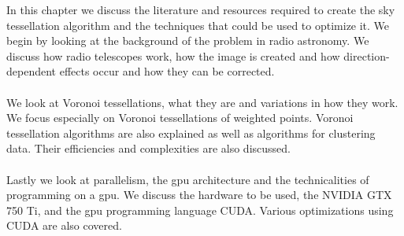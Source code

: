 In this chapter we discuss the literature and resources required to create the sky tessellation algorithm and the techniques that could be used to optimize it. We begin by looking at the background of the problem in radio astronomy. We discuss how radio telescopes work, how the image is created and how direction-dependent effects occur and how they can be corrected.
\\
\\
We look at Voronoi tessellations, what they are and variations in how they work. We focus especially on Voronoi tessellations of weighted points. Voronoi tessellation algorithms are also explained as well as algorithms for clustering data. Their efficiencies and complexities are also discussed.
\\
\\
Lastly we look at parallelism, the \gls{gpu} architecture and the technicalities of programming on a \gls{gpu}. We discuss the hardware to be used, the NVIDIA GTX 750 Ti, and the \gls{gpu} programming language CUDA. Various optimizations using CUDA are also covered.
